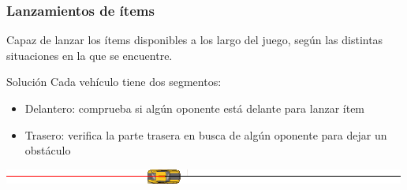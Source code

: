 \begin{frame}
    \frametitle{Lanzamientos de ítems}

    Capaz de lanzar los ítems disponibles a los largo del juego, según las
    distintas situaciones en la que se encuentre.

        \begin{block}{Solución}
        Cada vehículo tiene dos segmentos:
            \begin{itemize}
                \item Delantero: comprueba si algún oponente está delante para lanzar ítem
                \item Trasero: verifica la parte trasera en busca de algún oponente para dejar un obstáculo
            \end{itemize}
        \end{block}

        \begin{center}
                \includegraphics[scale=0.5]{imagenes/ia_segmentos.png}
        \end{center}

\end{frame}
